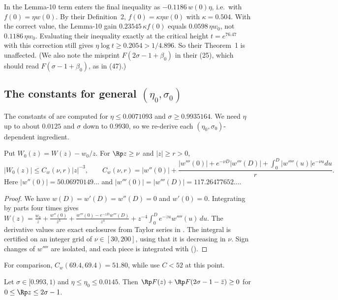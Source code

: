 \begin{remark}\label{rem:btyf0}
In \cite{BTY} the Lemma-10 term enters the final inequality as $-0.1186\,w(0)\eta$, i.e.\ with $f(0) = \eta w(0)$.
By their Definition~2, $f(0) = \kappa\eta w(0)$ with $\kappa = 0.504$.
With the correct value, the Lemma-10 gain $0.23545\,\kappa f(0)$ equals $0.0598\,\eta w_0$, not $0.1186\,\eta w_0$.
Evaluating their inequality exactly at the critical height $t = e^{76.47}$ with this correction still gives $\eta\log t \ge 0.2054 > 1/4.896$.
So their Theorem~1 is unaffected.
(We also note the misprint $F(2\sigma-1+\beta_0)$ in their (25), which should read $F(\sigma - 1 + \beta_0)$, as in (47).)
\end{remark}

\subsection{The constants for general $(\eta_0,\sigma_0)$}\label{ss:constants}
The constants of \cite{BTY} are computed for $\eta \le 0.0071093$ and $\sigma \ge 0.9935164$.
We need $\eta$ up to about $0.0125$ and $\sigma$ down to $0.9930$, so we re-derive each $(\eta_0,\sigma_0)$-dependent ingredient.

\begin{lemma}\label{lem:W0}
Put $W_0(z) = W(z) - w_0/z$. For $\Rp z \ge \nu$ and $|z| \ge r > 0$,
\[
|W_0(z)| \le C_w(\nu,r)|z|^{-3}, \qquad C_w(\nu,r) = |w''(0)| + \frac{|w'''(0)| + e^{-\nu D}|w'''(D)| + \int_0^D|w''''(u)|e^{-\nu u}du}{r} .
\]
Here $|w''(0)| = 50.06970149\ldots$ and $|w'''(0)| = |w'''(D)| = 117.26477652\ldots$.
\end{lemma}

\begin{proof}
We have $w(D) = w'(D) = w''(D) = 0$ and $w'(0) = 0$.
Integrating by parts four times gives
$W(z) = \frac{w_0}{z} + \frac{w''(0)}{z^3} + \frac{w'''(0) - e^{-zD}w'''(D)}{z^4} + z^{-4}\int_0^De^{-zu}w''''(u)\,du$.
The derivative values are exact enclosures from Taylor series in .
The integral is certified on an integer grid of $\nu \in [30,200]$, using that it is decreasing in $\nu$.
Sign changes of $w''''$ are isolated, and each piece is integrated with  ().
\end{proof}

For comparison, $C_w(69.4, 69.4) = 51.80$, while \cite{BTY} use $C < 52$ at this point.

\begin{lemma}\label{lem:L5}
Let $\sigma\in[0.993,1)$ and $\eta \le \eta_0 \le 0.0145$. Then $\Rp F(z) + \Rp F(2\sigma - 1 - \bar z) \ge 0$ for $0 \le \Rp z \le 2\sigma-1$.
\end{lemma}

